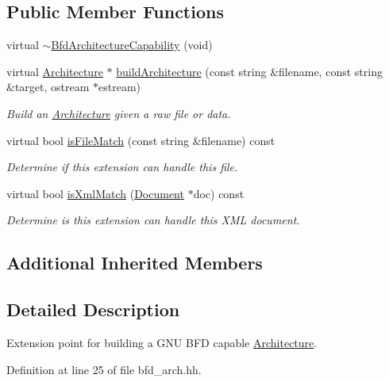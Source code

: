\subsection*{Public Member Functions}
\begin{DoxyCompactItemize}
\item 
virtual \mbox{\hyperlink{class_bfd_architecture_capability_ac262136bf3d1dce327a77dbf02c40a60}{$\sim$\+Bfd\+Architecture\+Capability}} (void)
\item 
virtual \mbox{\hyperlink{class_architecture}{Architecture}} $\ast$ \mbox{\hyperlink{class_bfd_architecture_capability_ac03b938e119bf80fcbc83b22db84ccf1}{build\+Architecture}} (const string \&filename, const string \&target, ostream $\ast$estream)
\begin{DoxyCompactList}\small\item\em Build an \mbox{\hyperlink{class_architecture}{Architecture}} given a raw file or data. \end{DoxyCompactList}\item 
virtual bool \mbox{\hyperlink{class_bfd_architecture_capability_a0191dabc12d97b8c5fc0ba14392077b1}{is\+File\+Match}} (const string \&filename) const
\begin{DoxyCompactList}\small\item\em Determine if this extension can handle this file. \end{DoxyCompactList}\item 
virtual bool \mbox{\hyperlink{class_bfd_architecture_capability_aa5231740c6fb12308f8e9a31ea291cf4}{is\+Xml\+Match}} (\mbox{\hyperlink{class_document}{Document}} $\ast$doc) const
\begin{DoxyCompactList}\small\item\em Determine is this extension can handle this X\+ML document. \end{DoxyCompactList}\end{DoxyCompactItemize}
\subsection*{Additional Inherited Members}


\subsection{Detailed Description}
Extension point for building a G\+NU B\+FD capable \mbox{\hyperlink{class_architecture}{Architecture}}. 

Definition at line 25 of file bfd\+\_\+arch.\+hh.




